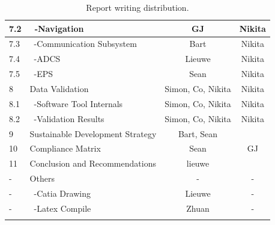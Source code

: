 \begin{center}
\begin{longtable}{|l|l|c|c|}
 7.2   & \ -Navigation                        & GJ & Nikita\\\hline
 7.3     & \ -Communication Subsystem           & Bart & Nikita\\\hline
 7.4     & \ -ADCS                              & Lieuwe & Nikita\\\hline
 7.5     & \ -EPS                               & Sean & Nikita\\\hline\hline
 8       & Data Validation                      & Simon, Co, Nikita & Nikita \\\hline
 8.1     & \ -Software Tool Internals           & Simon, Co, Nikita & Nikita \\\hline
 8.2     & \ -Validation Results                & Simon, Co, Nikita & Nikita \\\hline\hline
 9       & Sustainable Development Strategy     &Bart, Sean & \\\hline\hline
 10      & Compliance Matrix                    & Sean & GJ \\\hline\hline
 11      & Conclusion and Recommendations       & lieuwe &\\\hline\hline
 -       & Others                               & - & - \\\hline
 -       & \ -Catia Drawing                     & Lieuwe & -\\\hline
 -       & \ -Latex Compile                     & Zhuan & -\\\hline

\caption{Report writing distribution.}
\label{tab:RWD}
\end{longtable}
\end{center}